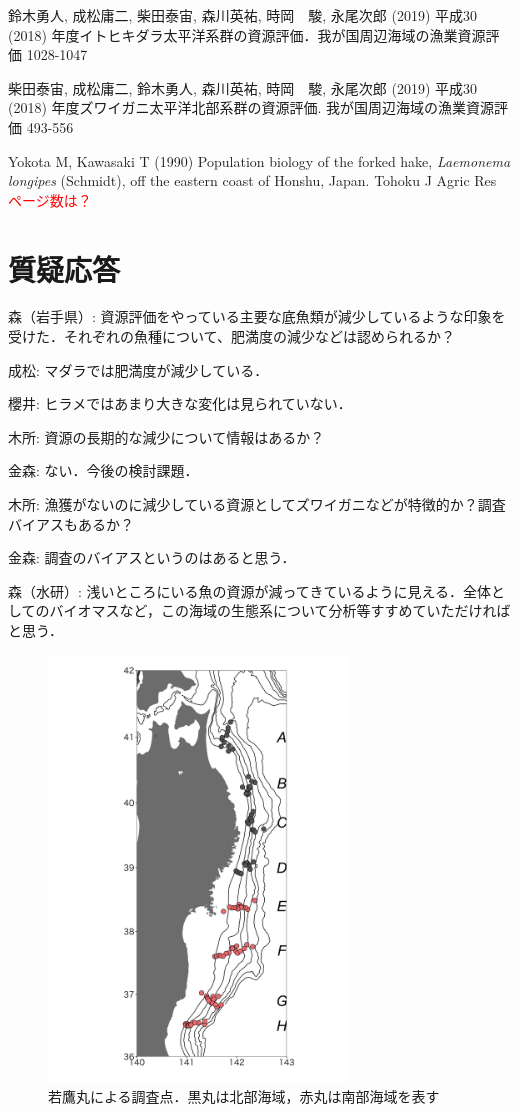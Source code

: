 \documentclass[11pt]{article} %
\begin{document}
\begin{linenumbers}
\hangindent=30pt
\noindent
鈴木勇人, 成松庸二, 柴田泰宙, 森川英祐, 時岡　駿, 永尾次郎 (2019) 平成30 (2018) 年度イトヒキダラ太平洋系群の資源評価．我が国周辺海域の漁業資源評価 1028-1047

\hangindent=30pt
\noindent
柴田泰宙, 成松庸二, 鈴木勇人, 森川英祐, 時岡　駿, 永尾次郎 (2019) 平成30 (2018) 
年度ズワイガニ太平洋北部系群の資源評価. 我が国周辺海域の漁業資源評価 493-556

\hangindent=30pt
\noindent
Yokota M, Kawasaki T (1990) Population biology of the forked hake, \textit{Laemonema longipes} 
 (Schmidt), off the eastern coast of Honshu, Japan. Tohoku J Agric Res 
\textcolor{red}{ページ数は？}

\section{質疑応答}
森（岩手県）: 資源評価をやっている主要な底魚類が減少しているような印象を受けた．それぞれの魚種について、肥満度の減少などは認められるか？

成松: マダラでは肥満度が減少している．

櫻井: ヒラメではあまり大きな変化は見られていない．

木所: 資源の長期的な減少について情報はあるか？  

金森: ない．今後の検討課題．

木所: 漁獲がないのに減少している資源としてズワイガニなどが特徴的か？調査バイアスもあるか？

金森: 調査のバイアスというのはあると思う．

森（水研）: 浅いところにいる魚の資源が減ってきているように見える．全体としてのバイオマスなど，この海域の生態系について分析等すすめていただければと思う．

\begin{figure}[h]
  \centering
  \includegraphics[width = 8cm]{fig1.png}
  \caption{若鷹丸による調査点．黒丸は北部海域，赤丸は南部海域を表す}
\end{figure}


\end{linenumbers}
\end{document}

